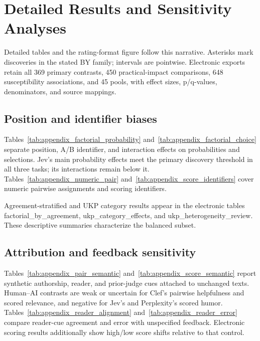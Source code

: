 \section{Detailed Results and Sensitivity Analyses}

\label{app:results_all}

Detailed tables and the rating-format figure follow this narrative. Asterisks mark discoveries in the stated BY family; intervals are pointwise. Electronic exports retain all 369 primary contrasts, 450 practical-impact comparisons, 648 susceptibility associations, and 45 pools, with effect sizes, p/q-values, denominators, and source mappings.

\subsection{Position and identifier biases}

\label{app:results_identifiers}

Tables~\ref{tab:appendix_factorial_probability} and~\ref{tab:appendix_factorial_choice} separate position, A/B identifier, and interaction effects on probabilities and selections. Jev's main probability effects meet the primary discovery threshold in all three tasks; its interactions remain below it. Tables~\ref{tab:appendix_numeric_pair} and~\ref{tab:appendix_score_identifiers} cover numeric pairwise assignments and scoring identifiers.

Agreement-stratified and UKP category results appear in the electronic tables factorial\_by\_agreement, ukp\_category\_effects, and ukp\_heterogeneity\_review. These descriptive summaries characterize the balanced subset.

\subsection{Attribution and feedback sensitivity}

\label{app:results_cues}

Tables~\ref{tab:appendix_pair_semantic} and~\ref{tab:appendix_score_semantic} report synthetic authorship, reader, and prior-judge cues attached to unchanged texts. Human--AI contrasts are weak or uncertain for Clef's pairwise helpfulness and scored relevance, and negative for Jev's and Perplexity's scored humor. Tables~\ref{tab:appendix_reader_alignment} and~\ref{tab:appendix_reader_error} compare reader-cue agreement and error with unspecified feedback. Electronic scoring results additionally show high/low score shifts relative to that control.

